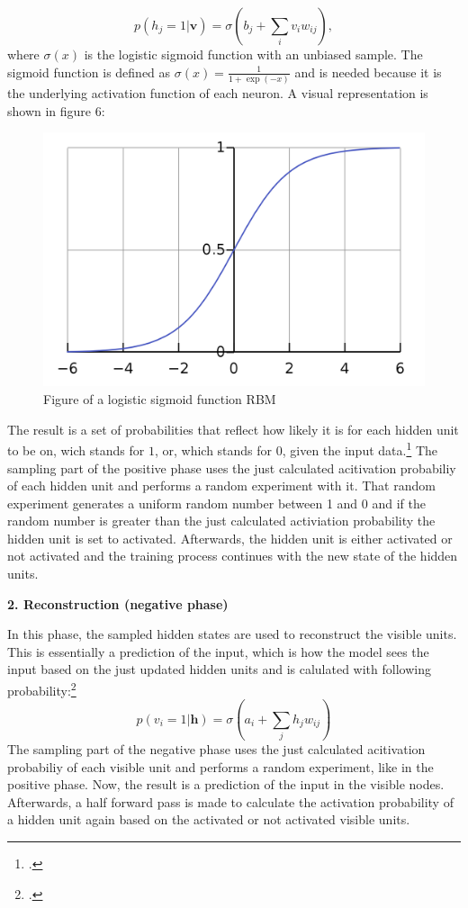\begin{equation}
p(h_j = 1 | \textbf{v}) = \sigma(b_j + \sum_i v_i w_{ij}),
\end{equation}
where $\sigma(x)$ is the logistic sigmoid function with an unbiased sample. The sigmoid function is defined as $\sigma(x) = \frac{1}{1 + \exp(-x)}$ and is needed because it is the underlying activation function of each neuron.
A visual representation is shown in figure 6:
\begin{figure}[H]
    \centering
    \includegraphics[width=0.5\linewidth]{graphics/logistic_sigmoid.png}
    \caption{Figure of a logistic sigmoid function \ac{RBM}}
\end{figure}
The result is a set of probabilities that reflect how likely it is for each hidden unit to be on, wich stands for \( 1 \), or, which stands for \( 0 \), given the input data.\footcite[cf.][6]{huembeliPhysicsEnergybasedModels2022}
The sampling part of the positive phase uses the just calculated acitivation probabiliy of each hidden unit and performs a random experiment with it.
That random experiment generates a uniform random number between 1 and 0 and if the random number is greater than the just calculated activiation probability the hidden unit is set to activated.
Afterwards, the hidden unit is either activated or not activated and the training process continues with the new state of the hidden units.

\textbf{2. Reconstruction (negative phase)}

In this phase, the sampled hidden states are used to reconstruct the visible units. 
This is essentially a prediction of the input, which is how the model sees the input based on the just updated hidden units and is calulated with following probability:\footcite[cf.][6]{hintonPracticalGuideTraining2012}
\begin{equation}
    p(v_i = 1 | \mathbf{h}) = \sigma(a_i + \sum_j h_j w_{ij})
\end{equation}
The sampling part of the negative phase uses the just calculated acitivation probabiliy
of each visible unit and performs a random experiment, like in the positive phase.
Now, the result is a prediction of the input in the visible nodes.
Afterwards, a half forward pass is made to calculate the activation probability of a hidden unit again based on the activated or not activated visible units.

